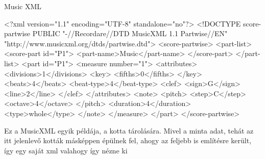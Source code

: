 \begin{large}
	Music XML
\end{large}
\begin{xml}
<?xml version="1.1" encoding="UTF-8" standalone="no"?>
<!DOCTYPE score-partwise PUBLIC
"-//Recordare//DTD MusicXML 1.1 Partwise//EN"
"http://www.musicxml.org/dtds/partwise.dtd">
  <score-partwise>
    <part-list>
      <score-part id="P1">
        <part-name>Music</part-name>
      </score-part>
    </part-list>
    <part id="P1">
      <measure number="1">
        <attributes>
          <divisions>1</divisions>
          <key>
            <fifths>0</fifths>
          </key>
          <beats>4</beats>
          <beat-type>4</beat-type>
          <clef>
            <sign>G</sign>
            <line>2</line>
          </clef>
        </attributes>
        <note>
          <pitch>
            <step>C</step>
            <octave>4</octave>
          </pitch>
          <duration>4</duration>
          <type>whole</type>
        </note>
      </measure>
    </part>
  </score-partwise>
\end{xml}

Ez a MusicXML egyik példája, a kotta tárolására. Mivel a minta adat, tehát az itt jelenlevő kották másképpen épülnek fel, ahogy az feljebb is említésre került, így egy saját xml valahogy így nézne ki

